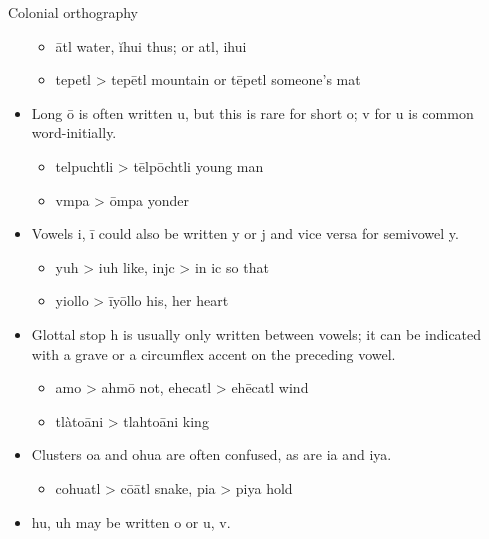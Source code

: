 \documentclass[12pt]{beamer}
\newcommand{\nah}[1]{\textcolor{nahgrn}{#1}}
\newcommand{\trs}[1]{\textcolor{nahblu}{#1}}
\begin{document}
\begin{frame}
\begin{columns}[t]
\begin{column}{.23\linewidth}
\begin{block}{Colonial orthography}
\begin{itemize}
\begin{itemize}
                  \item  \nah{ātl} \trs{water}, \nah{ĭhui} \trs{thus}; or \nah{atl}, \nah{ihui}
                  \item  \nah{tepetl} > \nah{tepētl} \trs{mountain} or \nah{tēpetl} \trs{someone's mat}
                \end{itemize}
          \item  Long \nah{ō} is often written \nah{u}, but this is rare for short \nah{o}; \nah{v} for \nah{u} is common word-initially.
                \begin{itemize}
                  \item \nah{telpuchtli} > \nah{tēlpōchtli} \trs{young man}
                  \item \nah{vmpa} > \nah{ōmpa} \trs{yonder}
                \end{itemize}
          \item Vowels \nah{i}, \nah{ī} could also be written \nah{y} or \nah{j} and vice versa for semivowel \nah{y}.
                \begin{itemize}
                  \item \nah{yuh} > \nah{iuh} \trs{like}, \nah{injc} > \nah{in ic} \trs{so that}
                  \item \nah{yiollo} > \nah{īyōllo} \trs{his, her heart}
                \end{itemize}
          \item Glottal stop \nah{h} is usually only written between vowels; it can be indicated with  a grave or a circumflex accent on the preceding vowel.
                \begin{itemize}
                  \item \nah{amo} > \nah{ahmō} \trs{not}, \nah{ehecatl} > \nah{ehēcatl} \trs{wind}
                  \item \nah{tlàtoāni} > \nah{tlahtoāni} \trs{king}
                \end{itemize}
          \item Clusters \nah{oa} and \nah{ohua} are often confused, as are \nah{ia} and \nah{iya}.
                \begin{itemize}
                  \item \nah{cohuatl} > \nah{cōātl} \trs{snake}, \nah{pia} > \nah{piya} \trs{hold}
                \end{itemize}
          \item \nah{hu, uh} may be written \nah{o} or \nah{u, v}.
                \begin{itemize}

\end{itemize}
\end{itemize}
\end{block}
\end{column}
\end{columns}
\end{frame}
\end{document}

